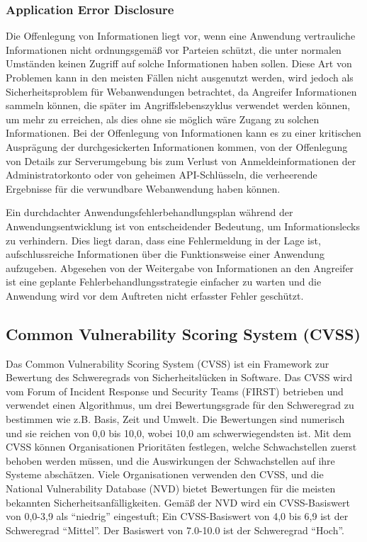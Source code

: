 \subsubsection{Application Error Disclosure}

Die Offenlegung von Informationen liegt vor, wenn eine Anwendung vertrauliche Informationen nicht ordnungsgemäß vor Parteien schützt, die unter normalen Umständen keinen Zugriff auf solche Informationen haben sollen. Diese Art von Problemen kann in den meisten Fällen nicht ausgenutzt werden, wird jedoch als Sicherheitsproblem für Webanwendungen betrachtet, da Angreifer Informationen sammeln können, die später im Angriffslebenszyklus verwendet werden können, um mehr zu erreichen, als dies ohne sie möglich wäre Zugang zu solchen Informationen. Bei der Offenlegung von Informationen kann es zu einer kritischen Ausprägung der durchgesickerten Informationen kommen, von der Offenlegung von Details zur Serverumgebung bis zum Verlust von Anmeldeinformationen der Administratorkonto oder von geheimen API-Schlüsseln, die verheerende Ergebnisse für die verwundbare Webanwendung haben können\cite{infdiscissattack17}.

Ein durchdachter Anwendungsfehlerbehandlungsplan während der Anwendungsentwicklung ist von entscheidender Bedeutung, um Informationslecks zu verhindern. Dies liegt daran, dass eine Fehlermeldung in der Lage ist, aufschlussreiche Informationen über die Funktionsweise einer Anwendung aufzugeben. Abgesehen von der Weitergabe von Informationen an den Angreifer ist eine geplante Fehlerbehandlungsstrategie einfacher zu warten und die Anwendung wird vor dem Auftreten nicht erfasster Fehler geschützt\cite{ase17}.

\subsection{Common Vulnerability Scoring System (CVSS)}

Das Common Vulnerability Scoring System (CVSS) ist ein Framework zur Bewertung des Schweregrads von Sicherheitslücken in Software. Das CVSS wird vom Forum of Incident Response und Security Teams (FIRST) betrieben und verwendet einen Algorithmus, um drei Bewertungsgrade für den Schweregrad zu bestimmen wie z.B. Basis, Zeit und Umwelt. Die Bewertungen sind numerisch und sie reichen von 0,0 bis 10,0, wobei 10,0 am schwerwiegendsten ist. Mit dem CVSS können Organisationen Prioritäten festlegen, welche Schwachstellen zuerst behoben werden müssen, und die Auswirkungen der Schwachstellen auf ihre Systeme abschätzen. Viele Organisationen verwenden den CVSS, und die National Vulnerability Database (NVD) bietet Bewertungen für die meisten bekannten Sicherheitsanfälligkeiten. Gemäß der NVD wird ein CVSS-Basiswert von 0,0-3,9 als "`niedrig"' eingestuft; Ein CVSS-Basiswert von 4,0 bis 6,9 ist der Schweregrad "`Mittel"'. Der Basiswert von 7.0-10.0 ist der Schweregrad "`Hoch"'\cite{cvss16}.\\

